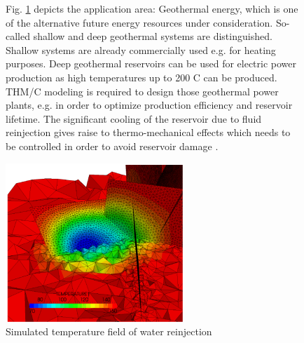 \begin{figure}[!htb]
\begin{minipage}[t]{0.48\textwidth}
Fig. \ref{fig:apl3} depicts the application area: Geothermal energy, which is one of the alternative future energy resources under consideration. So-called shallow and deep geothermal systems are distinguished. Shallow systems are already commercially used e.g. for heating purposes. Deep geothermal reservoirs can be used for electric power production as high temperatures up to 200 C can be produced. THM/C modeling is required to design those geothermal power plants, e.g. in order to optimize production efficiency and reservoir lifetime. The significant cooling of the reservoir due to fluid reinjection gives raise to thermo-mechanical effects which needs to be controlled in order to avoid reservoir damage \cite{WatanabeEtAl:2010}.
\end{minipage}
\hspace{0.02\textwidth}
\begin{minipage}[t]{0.48\textwidth}
\vspace{1cm}
\includegraphics[scale=0.63]{figures/intro3}
\caption{Simulated temperature field of water reinjection}
\label{fig:apl3}
\end{minipage}
\end{figure}


